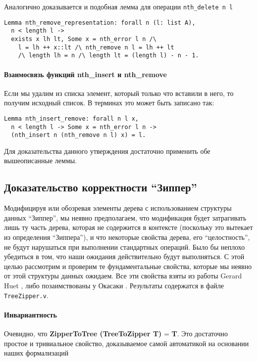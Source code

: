 Аналогично доказывается и подобная лемма для операции \texttt{nth\_delete n l}
\begin{lstlisting}
Lemma nth_remove_representation: forall n (l: list A),
  n < length l ->
  exists x lh lt, Some x = nth_error l n /\
    l = lh ++ x::lt /\ nth_remove n l = lh ++ lt
    /\ length lh = n /\ length lt = (length l) - n - 1.
\end{lstlisting}

\paragraph{Взаимосвязь функций nth\_insert и nth\_remove} Если мы удалим из списка элемент, который только что вставили в него, то получим исходный список. В терминах \tcoq это может быть записано так:
\begin{lstlisting}
Lemma nth_insert_remove: forall n l x,
  n < length l -> Some x = nth_error l n ->
  (nth_insert n (nth_remove n l) x) = l.
\end{lstlisting}

Для доказательства данного утверждения достаточно применить обе вышеописанные леммы.

\subsection{Доказательство корректности ``Зиппер''}

Модифицируя или обозревая элементы дерева с использованием структуры данных ``Зиппер'', мы неявно предполагаем, что модификация будет затрагивать лишь ту часть дерева, которая не содержится в контексте (поскольку это вытекает из определения ``Зиппера''), и что некоторые свойства дерева, его ``целостность'', не будут нарушаться при выполнении стандартных операций. Было бы неплохо убедиться в том, что наши ожидания действительно будут выполняться. С этой целью рассмотрим и проверим те фундаментальные свойства, которые мы неявно от этой структуры данных ожидаем. Все эти свойства взяты из работы Gerard Huet \autocite{Huet1997}, либо позаимствованы у Окасаки \autocite{Okasaki1996}. Результаты содержатся в файле \texttt{TreeZipper.v}.

\paragraph{Инвариантность}
Очевидно, что \textbf{ZipperToTree (TreeToZipper T)} = \textbf{T}. Это достаточно простое и тривиальное свойство, доказываемое самой автоматикой \tcoq на основании наших формализаций

